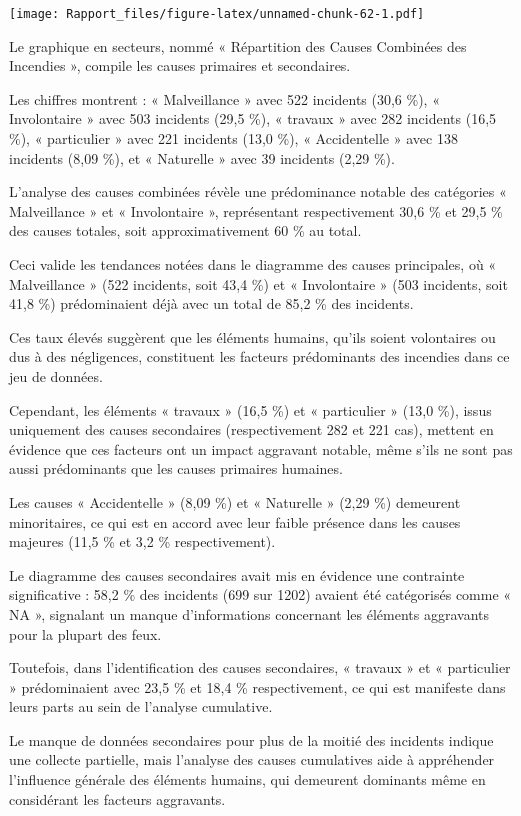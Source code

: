 \documentclass[
]{article}
\begin{document}
\texttt{[image: Rapport\_files/figure-latex/unnamed-chunk-62-1.pdf]}

Le graphique en secteurs, nommé « Répartition des Causes Combinées des
Incendies », compile les causes primaires et secondaires.

Les chiffres montrent : « Malveillance » avec 522 incidents (30,6 \%), «
Involontaire » avec 503 incidents (29,5 \%), « travaux » avec 282
incidents (16,5 \%), « particulier » avec 221 incidents (13,0 \%), «
Accidentelle » avec 138 incidents (8,09 \%), et « Naturelle » avec 39
incidents (2,29 \%).

L'analyse des causes combinées révèle une prédominance notable des
catégories « Malveillance » et « Involontaire », représentant
respectivement 30,6 \% et 29,5 \% des causes totales, soit
approximativement 60 \% au total.

Ceci valide les tendances notées dans le diagramme des causes
principales, où « Malveillance » (522 incidents, soit 43,4 \%) et «
Involontaire » (503 incidents, soit 41,8 \%) prédominaient déjà avec un
total de 85,2 \% des incidents.

Ces taux élevés suggèrent que les éléments humains, qu'ils soient
volontaires ou dus à des négligences, constituent les facteurs
prédominants des incendies dans ce jeu de données.

Cependant, les éléments « travaux » (16,5 \%) et « particulier » (13,0
\%), issus uniquement des causes secondaires (respectivement 282 et 221
cas), mettent en évidence que ces facteurs ont un impact aggravant
notable, même s'ils ne sont pas aussi prédominants que les causes
primaires humaines.

Les causes « Accidentelle » (8,09 \%) et « Naturelle » (2,29 \%)
demeurent minoritaires, ce qui est en accord avec leur faible présence
dans les causes majeures (11,5 \% et 3,2 \% respectivement).

Le diagramme des causes secondaires avait mis en évidence une contrainte
significative : 58,2 \% des incidents (699 sur 1202) avaient été
catégorisés comme « NA », signalant un manque d'informations concernant
les éléments aggravants pour la plupart des feux.

Toutefois, dans l'identification des causes secondaires, « travaux » et
« particulier » prédominaient avec 23,5 \% et 18,4 \% respectivement, ce
qui est manifeste dans leurs parts au sein de l'analyse cumulative.

Le manque de données secondaires pour plus de la moitié des incidents
indique une collecte partielle, mais l'analyse des causes cumulatives
aide à appréhender l'influence générale des éléments humains, qui
demeurent dominants même en considérant les facteurs aggravants.
\end{document}
